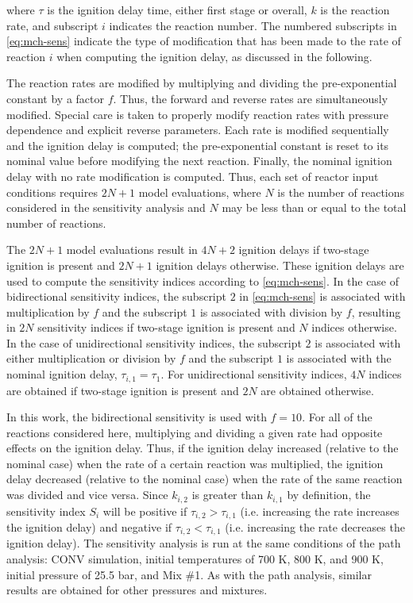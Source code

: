 \documentclass[12pt, letterpaper]{article}
\begin{document}
where $\tau$ is the ignition delay time, either first stage or overall, $k$ is
the reaction rate, and subscript $i$ indicates the reaction number. The
numbered subscripts in \autoref{eq:mch-sens} indicate the type of modification
that has been made to the rate of reaction $i$ when computing the ignition
delay, as discussed in the following.

The reaction rates are modified by multiplying and dividing the pre-exponential
constant by a factor $f$. Thus, the forward and reverse rates are
simultaneously modified. Special care is taken to properly modify reaction
rates with pressure dependence and explicit reverse parameters. Each rate is
modified sequentially and the ignition delay is computed; the pre-exponential
constant is reset to its nominal value before modifying the next reaction.
Finally, the nominal ignition delay with no rate modification is computed.
Thus, each set of reactor input conditions requires $2N+1$ model evaluations,
where $N$ is the number of reactions considered in the sensitivity analysis
and $N$ may be less than or equal to the total number of reactions.

The $2N+1$ model evaluations result in $4N+2$ ignition delays if two-stage
ignition is present and $2N+1$ ignition delays otherwise. These ignition delays
are used to compute the sensitivity indices according to \autoref{eq:mch-sens}.
In the case of bidirectional sensitivity indices, the subscript $2$ in
\autoref{eq:mch-sens} is associated with multiplication by $f$ and the subscript
$1$ is associated with division by $f$, resulting in $2N$ sensitivity indices if
two-stage ignition is present and $N$ indices otherwise. In the case of
unidirectional sensitivity indices, the subscript $2$ is associated with either
multiplication or division by $f$ and the subscript $1$ is associated with the
nominal ignition delay, $\tau_{i,1}=\tau_1$. For unidirectional sensitivity
indices, $4N$ indices are obtained if two-stage ignition is present and $2N$ are
obtained otherwise.

In this work, the bidirectional sensitivity is used with $f=10$. For all of the
reactions considered here, multiplying and dividing a given rate had opposite
effects on the ignition delay. Thus, if the ignition delay increased (relative
to the nominal case) when the rate of a certain reaction was multiplied, the
ignition delay decreased (relative to the nominal case) when the rate of the
same reaction was divided and vice versa. Since $k_{i,2}$ is greater than
$k_{i,1}$ by definition, the sensitivity index $S_i$ will be positive if
$\tau_{i,2}>\tau_{i,1}$ (i.e. increasing the rate increases the ignition delay)
and negative if $\tau_{i,2}<\tau_{i,1}$ (i.e. increasing the rate decreases the
ignition delay). The sensitivity analysis is run at the same conditions of the
path analysis: CONV simulation, initial temperatures of 700 K, 800 K, and 900 K,
initial pressure of 25.5 bar, and Mix \#1. As with the path analysis, similar
results are obtained for other pressures and mixtures.
\end{document}
